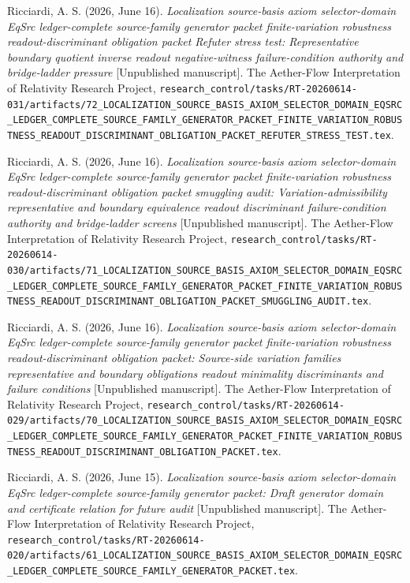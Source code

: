 \documentclass[11pt]{article}
\begin{document}
Ricciardi, A. S. (2026, June 16). \emph{Localization source-basis axiom
selector-domain EqSrc ledger-complete source-family generator packet
finite-variation robustness readout-discriminant obligation packet
Refuter stress test: Representative boundary quotient inverse readout
negative-witness failure-condition authority and bridge-ladder
pressure} [Unpublished manuscript]. The Aether-Flow Interpretation of
Relativity Research Project,
\texttt{research\_control/tasks/RT-20260614-031/artifacts/72\_LOCALIZATION\_SOURCE\_BASIS\_AXIOM\_SELECTOR\_DOMAIN\_EQSRC\_LEDGER\_COMPLETE\_SOURCE\_FAMILY\_GENERATOR\_PACKET\_FINITE\_VARIATION\_ROBUSTNESS\_READOUT\_DISCRIMINANT\_OBLIGATION\_PACKET\_REFUTER\_STRESS\_TEST.tex}.

Ricciardi, A. S. (2026, June 16). \emph{Localization source-basis axiom
selector-domain EqSrc ledger-complete source-family generator packet
finite-variation robustness readout-discriminant obligation packet
smuggling audit: Variation-admissibility representative and boundary
equivalence readout discriminant failure-condition authority and
bridge-ladder screens} [Unpublished manuscript]. The Aether-Flow
Interpretation of Relativity Research Project,
\texttt{research\_control/tasks/RT-20260614-030/artifacts/71\_LOCALIZATION\_SOURCE\_BASIS\_AXIOM\_SELECTOR\_DOMAIN\_EQSRC\_LEDGER\_COMPLETE\_SOURCE\_FAMILY\_GENERATOR\_PACKET\_FINITE\_VARIATION\_ROBUSTNESS\_READOUT\_DISCRIMINANT\_OBLIGATION\_PACKET\_SMUGGLING\_AUDIT.tex}.

Ricciardi, A. S. (2026, June 16). \emph{Localization source-basis axiom
selector-domain EqSrc ledger-complete source-family generator packet
finite-variation robustness readout-discriminant obligation packet:
Source-side variation families representative and boundary obligations
readout minimality discriminants and failure conditions} [Unpublished
manuscript]. The Aether-Flow Interpretation of Relativity Research
Project,
\texttt{research\_control/tasks/RT-20260614-029/artifacts/70\_LOCALIZATION\_SOURCE\_BASIS\_AXIOM\_SELECTOR\_DOMAIN\_EQSRC\_LEDGER\_COMPLETE\_SOURCE\_FAMILY\_GENERATOR\_PACKET\_FINITE\_VARIATION\_ROBUSTNESS\_READOUT\_DISCRIMINANT\_OBLIGATION\_PACKET.tex}.

Ricciardi, A. S. (2026, June 15). \emph{Localization source-basis axiom
selector-domain EqSrc ledger-complete source-family generator packet:
Draft generator domain and certificate relation for future audit}
[Unpublished manuscript]. The Aether-Flow Interpretation of
Relativity Research Project,
\texttt{research\_control/tasks/RT-20260614-020/artifacts/61\_LOCALIZATION\_SOURCE\_BASIS\_AXIOM\_SELECTOR\_DOMAIN\_EQSRC\_LEDGER\_COMPLETE\_SOURCE\_FAMILY\_GENERATOR\_PACKET.tex}.
\end{document}
